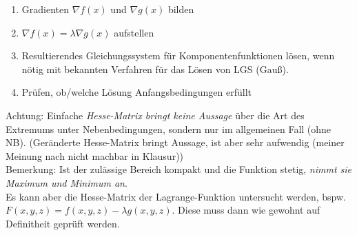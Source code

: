 \begin{enumerate}
    \item Gradienten $\nabla f(x)$ und $\nabla g(x)$ bilden
    \item $\nabla f(x) = \lambda \nabla g(x)$ aufstellen
    \item Resultierendes Gleichungssystem für Komponentenfunktionen lösen, wenn nötig mit bekannten Verfahren für das Lösen von LGS (Gauß).
    \item Prüfen, ob/welche Lösung Anfangsbedingungen erfüllt
\end{enumerate}
Achtung: Einfache \emph{Hesse-Matrix bringt keine Aussage} über die Art des Extremums unter Nebenbedingungen, sondern nur im allgemeinen Fall (ohne NB). (Geränderte Hesse-Matrix bringt Aussage, ist aber sehr aufwendig (meiner Meinung nach nicht machbar in Klausur))\\
\noindent
Bemerkung: Ist der zulässige Bereich kompakt und die Funktion stetig, \emph{nimmt sie Maximum und Minimum an}.\\
\noindent
Es kann aber die Hesse-Matrix der Lagrange-Funktion untersucht werden, bspw. $F(x,y,z)=f(x,y,z)-\lambda g(x,y,z)$. Diese muss dann wie gewohnt auf Definitheit geprüft werden.